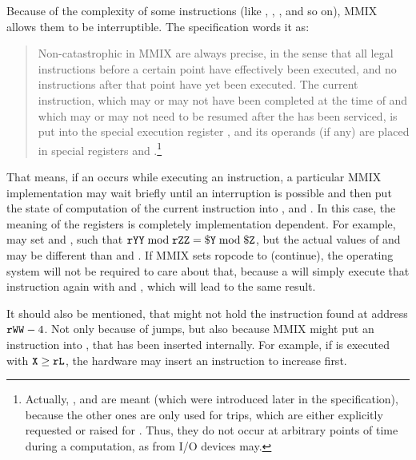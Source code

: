 Because of the complexity of some instructions (like , , ,  and so on), MMIX allows them to be interruptible. The specification words it as:
\begin{quote}
Non-catastrophic  in MMIX are always precise, in the sense that all legal instructions before a certain point have effectively been executed, and no instructions after that point have yet been executed. The current instruction, which may or may not have been completed at the time of  and which may or may not need to be resumed after the  has been serviced, is put into the special execution register , and its operands (if any) are placed in special registers  and .\footnote{Actually, ,  and  are meant (which were introduced later in the specification), because the other ones are only used for trips, which are either explicitly requested or raised for . Thus, they do not occur at arbitrary points of time during a computation, as  from I/O devices may.} \citep[pg. 27]{mmix-doc}
\end{quote}
That means, if an  occurs while executing an instruction, a particular MMIX implementation may wait briefly until an interruption is possible and then put the state of computation of the current instruction into ,  and . In this case, the meaning of the registers is completely implementation dependent. For example,  may set  and , such that ${\tt rYY} \bmod {\tt rZZ} = {\tt \$Y} \bmod {\tt \$Z}$, but the actual values of  and  may be different than  and . \citep[pg. 27 and 29]{mmix-doc} If MMIX sets ropcode to  (continue), the operating system will not be required to care about that, because a  will simply execute that instruction again with  and , which will lead to the same result.

It should also be mentioned, that  might not hold the instruction found at address ${\tt rWW}-4$. Not only because of jumps, but also because MMIX might put an instruction into , that has been inserted internally. For example, if  is executed with ${\tt X} \ge {\tt rL}$, the hardware may insert an instruction to increase  first.

